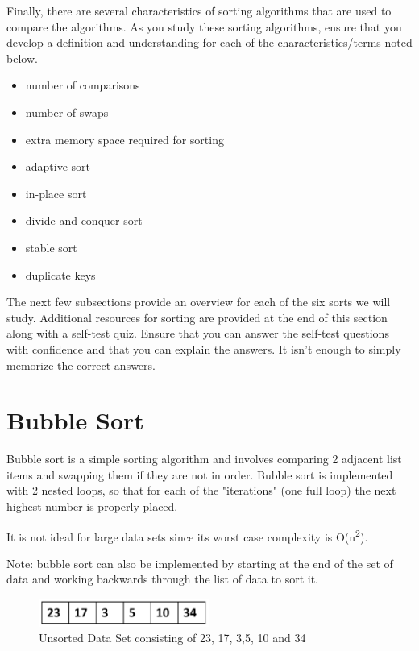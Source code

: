 Finally,  there are several characteristics of sorting algorithms that are used to compare the algorithms.   As you study these sorting algorithms, ensure that you develop a definition and understanding for each of the characteristics/terms noted below.

\begin{itemize}
\item number of comparisons
\item number of swaps
\item extra memory space required for sorting
\item adaptive sort
\item in-place sort
\item divide and conquer sort
\item stable sort
\item duplicate keys
\end{itemize}

The next few subsections provide an overview for each of the six sorts we will study.  Additional resources for sorting are provided at the end of this section along with a self-test quiz.    Ensure that you can answer the self-test questions with confidence and that you can explain the answers.  It isn't enough to simply memorize the correct answers.

\section{Bubble Sort}
Bubble sort is a simple sorting algorithm and involves comparing 2 adjacent list items and swapping them if they are not in order. Bubble sort is implemented with 2 nested loops, so that for each of the "iterations" (one full loop) the next highest number is properly placed. \newline

It is not ideal for large data sets since its worst case complexity is O(n\textsuperscript{2}).\newline

Note: bubble sort can also be implemented by starting at the end of the set of data and working backwards through the list of data to sort it.

\begin{figure}[H]
\centering
\includegraphics[width=0.5\textwidth]{pictures/bubble1.png}
\caption{Unsorted Data Set consisting of 23, 17, 3,5, 10 and 34}
\label{fig:bubble1}
\end{figure}

